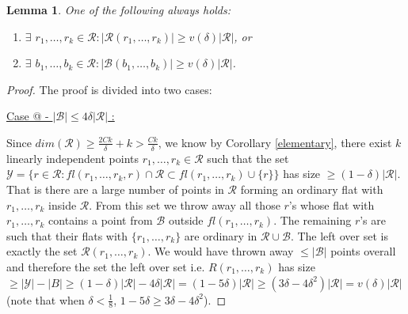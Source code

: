 \documentclass[12pt]{caltech_thesis}
\makeatletter
\theoremstyle{plain}
\newtheorem{lemma}{Lemma}
\theoremstyle{definition}
\newcommand{\MB}{\mathcal{B}}
\newcommand{\MR}{\mathcal{R}}
\newcommand{\MY}{\mathcal{Y}}
\newcommand*{\rom}[1]{\expandafter\@slowromancap\romannumeral #1@}
\makeatother
\begin{document}
 
\begin{lemma}\label{lemma:largeordinaryproof}
 One of the following always holds:
 \begin{enumerate}
  \item \label{bullet:redlarge} $\exists$ $r_1,\ldots,r_k \in \MR :  |\MR(r_1,\ldots,r_k)|\geq v(\delta)|\MR|$,  or 
  
  \item \label{bullet:bluelarge} $\exists$ $b_1,\ldots,b_k \in \MR :  |\MB(b_1,\ldots,b_k)|\geq v(\delta)|\MR|$.
  
 \end{enumerate}
 
\end{lemma}
\begin{proof}
 The proof is divided into two cases:
 
\underline{Case \rom{1} - $|\MB|\leq 4\delta|\MR|$ : } 

Since $dim(\MR)\geq \frac{2Ck}{\delta} + k>\frac{Ck}{\delta}$, we know by Corollary \ref{elementary}, there exist $k$ linearly independent
points $r_1,\ldots,r_k \in \MR$ such that
the set $\MY = \{ r\in \MR : fl(r_1,\ldots,r_k,r)\cap \MR \subset fl(r_1,\ldots,r_k)\cup \{r\}\}$ has size 
$\geq (1-\delta)|\MR|$. That is there are a large number of points in $\MR$ forming an ordinary flat with $r_1,\ldots,r_k$ inside $\MR$. 
From this set we throw away all those $r$'s whose flat with $r_1,\ldots,r_k$ contains  a point from $\MB$ outside $fl(r_1,\ldots,r_k)$. 
The remaining $r$'s are such that their flats with $\{r_1,\ldots,r_k\}$
are ordinary in $\MR\cup \MB$. The left over set is exactly the set $\MR(r_1,\ldots,r_k)$. We would have thrown away $\leq |\MB|$ points overall and therefore the set 
the left over set i.e. $R(r_1,\ldots,r_k)$ has size $\geq |\MY|-|B| \geq (1-\delta) |\MR| - 4\delta|\MR| = (1-5\delta)|\MR| \geq 
(3\delta-4\delta^2)|\MR| = v(\delta)|\MR|$ (note that when $\delta <\frac{1}{8}$, $1-5\delta \geq 3\delta-4\delta^2$).


\end{proof}
\end{document}
